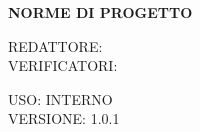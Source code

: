 \documentclass[5pt]{article}
\begin{document}
\vspace{24pt}

\begin{center}
	\textbf{\Large NORME DI PROGETTO }
\end{center}

\vspace{13pt}

\begin{flushleft}
	\begin{spacing}{1.5}
		REDATTORE: \\%
		VERIFICATORI: \\
	\end{spacing}
\end{flushleft}

\begin{flushright}
	\begin{spacing}{1}
		USO: INTERNO\\
		VERSIONE: 1.0.1\\
	\end{spacing}
\end{flushright}


\restoregeometry

\pagebreak


\pagebreak
\end{document}

